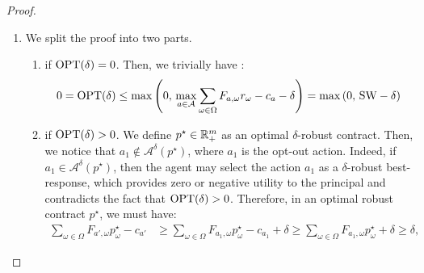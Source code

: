 \begin{proof}
\begin{enumerate}
\begin{align*}
			u^\sfP(p,a(p))  - u^\sfP(p',a^{\delta}(p'))  &= \sum_{\omega \in \Omega}F_{ a(p),\omega} (r_\omega - p_\omega ) - \left(\sum_{\omega \in \Omega}F_{ a^\delta(p'),\omega}(r_\omega - p_\omega' )  \right)\\
			&= \sum_{\omega \in \Omega}F_{ a(p),\omega} (r_\omega - p_\omega ) - \left(1 -\sqrt{\delta}\right) \left(\sum_{\omega \in \Omega}F_{ a^\delta(p'),\omega}(r_\omega - p_\omega)  \right)\\
			&\le \left(1 -\sqrt{\delta}\right) \left(\sum_{\omega \in \Omega} (F_{ a(p),\omega} - F_{ a^\delta(p'),\omega})(r_\omega - p_\omega)  \right) + \sqrt{\delta} \\
			&\le 2 \sqrt{\delta} - \delta,
		\end{align*}
		where the second equality holds thanks to the definition of $p'$, the first inequality because $u^\sfP(p,a(p)) \le 1$ for each $p \in \mathbb{R}^{m}_{+}$ and the second inequality because of .
		Finally, let $p \in \mathbb{R}$ be an optimal (non-robust) contract, then we have:
		\begin{align*}	
			\textnormal{OPT} - 2 \sqrt{\delta} + \delta \le  u^\sfP(p',a^{\delta}(p')) \le \textnormal{OPT}(\delta) ,
		\end{align*}
		concluding the first part of the proof. 
		\item We split the proof into two parts.
		\begin{enumerate}
			\item if $\textnormal{OPT}(\delta) = 0$. Then, we trivially have :
			\begin{equation*}
				0=\textnormal{OPT}(\delta)\le \max\left(0, \, \max_{a \in \mathcal{A}} \sum_{\omega \in \Omega}F_{a,\omega}r_\omega - c_a - \delta \right) = \max\left(0, \, \textnormal{SW} - \delta \right)
			\end{equation*}
			\item if $\textnormal{OPT}(\delta) > 0$.
			We define $p^\star \in \mathbb{R}^{m}_{+}$ as an optimal $\delta$-robust contract.
			Then, we notice that $a_{1} \not \in \mathcal{A}^{\delta}(p^\star)$, where $a_1$ is the opt-out action.
			Indeed, if $a_{1} \in \mathcal{A}^{\delta}(p^\star)$, then the agent may select the action $a_1$ as a $\delta$-robust best-response, which provides zero or negative utility to the principal and contradicts the fact that $\textnormal{OPT}(\delta) > 0$.
			Therefore, in an optimal robust contract $p^\star$, we must have:
			\begin{align*}
				\sum_{\omega \in \Omega} F_{a',\omega} p_\omega^\star - c_{a'}  &\ge  \sum_{\omega \in \Omega}  F_{a_1,\omega} p_\omega^\star - c_{a_1} + \delta\ge  \sum_{\omega \in \Omega}  F_{a_1,\omega} p_\omega^\star + \delta \ge \delta,

\end{align*}
\end{enumerate}
\end{enumerate}
\end{proof}
